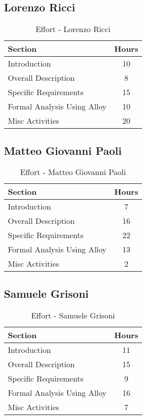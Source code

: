 \subsection*{Lorenzo Ricci}
\begin{table}[H]
    \centering
\begin{tabular}{|l|c|}
        \hline
        \textbf{Section} & \textbf{Hours} \\ \hline
        Introduction & 10 \\ \hline
        Overall Description & 8 \\ \hline
        Specific Requirements & 15\\ \hline
        Formal Analysis Using Alloy & 10 \\ \hline
        Misc Activities & 20 \\ \hline
    \end{tabular}
    \caption{Effort - Lorenzo Ricci}
    \label{tab:effotricci}
\end{table}
\subsection*{Matteo Giovanni Paoli}
\begin{table}[H]
    \centering
\begin{tabular}{|l|c|}
        \hline
        \textbf{Section} & \textbf{Hours} \\ \hline
        Introduction & 7 \\ \hline
        Overall Description & 16 \\ \hline
        Specific Requirements & 22\\ \hline
        Formal Analysis Using Alloy & 13 \\ \hline
        Misc Activities & 2 \\ \hline
    \end{tabular}
    \caption{Effort - Matteo Giovanni Paoli}
    \label{tab:effotpaoli}
\end{table}
\subsection*{Samuele Grisoni}
\begin{table}[H]
    \centering
\begin{tabular}{|l|c|}
        \hline
        \textbf{Section} & \textbf{Hours} \\ \hline
        Introduction & 11\\ \hline
        Overall Description & 15\\ \hline
        Specific Requirements & 9\\ \hline
        Formal Analysis Using Alloy & 16 \\ \hline
        Misc Activities & 7\\ \hline
    \end{tabular}
    \caption{Effort - Samuele Grisoni}
    \label{tab:effotgrisoni}
\end{table}